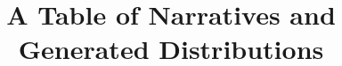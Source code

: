 \documentclass{article}
\begin{document}
\renewcommand{\comment}[1]{}
\title{A Table of Narratives and Generated Distributions}
\maketitle


\tableofcontents









\end{document}
